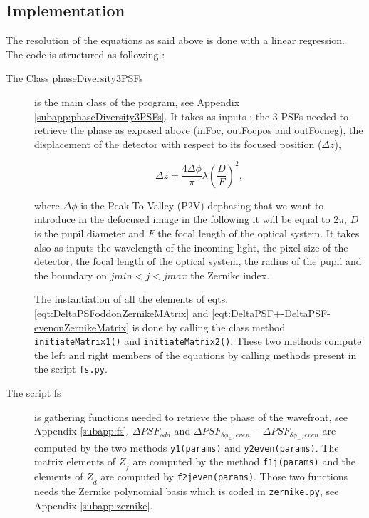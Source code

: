 \subsection{Implementation}

The resolution of the equations as said above is done with a linear regression. The code is structured as following :

\begin{description}
\item[The Class phaseDiversity3PSFs] is the main class of the program, see Appendix \ref{subapp:phaseDiversity3PSFs}. It takes as inputs : the 3 PSFs needed to retrieve the phase as exposed above (inFoc, outFocpos and outFocneg), the displacement of the detector with respect to its focused position ($\Delta z$),

\begin{equation}
\Delta z = \frac{4\Delta\phi}{\pi}\lambda \left(\frac{D}{F}\right)^2,
\label{eqt:Deltaz}
\end{equation}

where $\Delta\phi$ is the Peak To Valley (P2V) dephasing that we want to introduce in the defocused image in the following it will be equal to $2\pi$, $D$ is the pupil diameter and $F$ the focal length of the optical system. It takes also as inputs the wavelength of the incoming light, the pixel size of the detector, the focal length of the optical system, the radius of the pupil and the boundary on $jmin<j<jmax$ the Zernike index. 

The instantiation of all the elements of eqts. \eqref{eqt:DeltaPSFoddonZernikeMAtrix} and \eqref{eqt:DeltaPSF+-DeltaPSF-evenonZernikeMatrix} is done by calling the class method \verb!initiateMatrix1()! and \verb!initiateMatrix2()!. These two methods compute the left and right members of the equations by calling methods present in the script \verb!fs.py!.

\item[The script fs] is  gathering functions needed to retrieve the phase of the wavefront, see Appendix \ref{subapp:fs}. $\Delta PSF_{odd}$ and $\Delta PSF_{\delta\phi_+, even}-\Delta PSF_{\delta\phi_-, even}$ are computed by the two methods \verb!y1(params)! and \verb!y2even(params)!. The matrix elements of $\underline{Z}_f$ are computed by the method \verb!f1j(params)! and the elements of $\underline{Z}_d$ are computed by \verb!f2jeven(params)!. Those two functions needs the Zernike polynomial basis which is coded in \verb!zernike.py!, see Appendix \ref{subapp:zernike}.
\end{description}

